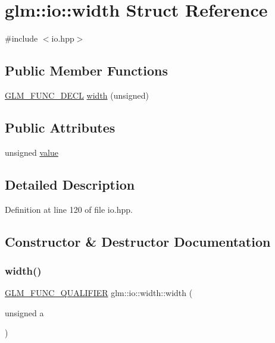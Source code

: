 \hypertarget{structglm_1_1io_1_1width}{}\section{glm\+::io\+::width Struct Reference}
\label{structglm_1_1io_1_1width}


{\ttfamily \#include $<$io.\+hpp$>$}

\subsection*{Public Member Functions}
\begin{DoxyCompactItemize}
\item 
\mbox{\hyperlink{setup_8hpp_ab2d052de21a70539923e9bcbf6e83a51}{G\+L\+M\+\_\+\+F\+U\+N\+C\+\_\+\+D\+E\+CL}} \mbox{\hyperlink{structglm_1_1io_1_1width_a1576674b7e08dc5014ce4f41ac6eea5b}{width}} (unsigned)
\end{DoxyCompactItemize}
\subsection*{Public Attributes}
\begin{DoxyCompactItemize}
\item 
unsigned \mbox{\hyperlink{structglm_1_1io_1_1width_a6bf1338eb947811d36ec93bd2e9b8425}{value}}
\end{DoxyCompactItemize}


\subsection{Detailed Description}


Definition at line 120 of file io.\+hpp.



\subsection{Constructor \& Destructor Documentation}
\mbox{\label{structglm_1_1io_1_1width_a1576674b7e08dc5014ce4f41ac6eea5b}} 
\subsubsection{\texorpdfstring{width()}{width()}}
{\footnotesize\ttfamily \mbox{\hyperlink{setup_8hpp_a33fdea6f91c5f834105f7415e2a64407}{G\+L\+M\+\_\+\+F\+U\+N\+C\+\_\+\+Q\+U\+A\+L\+I\+F\+I\+ER}} glm\+::io\+::width\+::width (\begin{DoxyParamCaption}\item[{unsigned}]{a }\end{DoxyParamCaption})\hspace{0.3cm}{\ttfamily [explicit]}}



